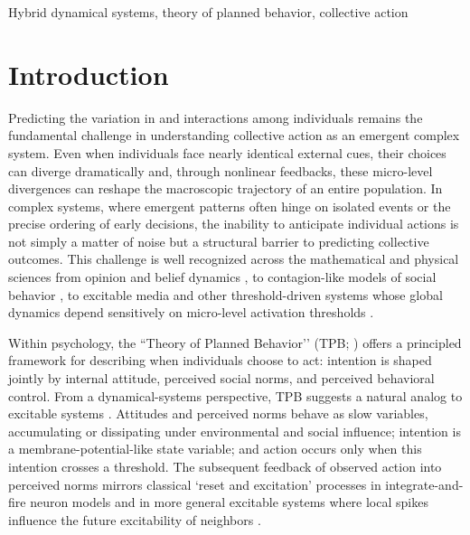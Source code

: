\documentclass[preprint,12pt]{elsarticle}
\begin{document}
\begin{frontmatter}
\begin{keyword}
    Hybrid dynamical systems, theory of planned behavior, collective action
\end{keyword}

\end{frontmatter}



\section{Introduction}\label{sec:introduction}
Predicting the variation in and interactions among individuals remains the fundamental challenge in understanding collective action as an emergent complex system. Even when individuals face nearly identical external cues, their choices can diverge dramatically and, through nonlinear feedbacks, these micro-level divergences can reshape the macroscopic trajectory of an entire population. In complex systems, where emergent patterns often hinge on isolated events or the precise ordering of early decisions, the inability to anticipate individual actions is not simply a matter of noise but a structural barrier to predicting collective outcomes. This challenge is well recognized across the mathematical and physical sciences from opinion and belief dynamics \cite{degroot1974reaching, hegselmann2002opinion, nowak2019nonlinear}, to contagion-like models of social behavior \cite{granovetter1978threshold, watts2002simple, spears2021social}, to excitable media and other threshold-driven systems whose global dynamics depend sensitively on micro-level activation thresholds \cite{acharya2021neuromorphic, marsh2024emergent}.

Within psychology, the ``Theory of Planned Behavior’’ (TPB; \cite{ajzen1991theory, bosnjak2020theory}) offers a principled framework for describing when individuals choose to act: intention is shaped jointly by internal attitude, perceived social norms, and perceived behavioral control. From a dynamical-systems perspective, TPB suggests a natural analog to excitable systems \cite{ciszak2004coupling,gerstner2002spiking}. Attitudes and perceived norms behave as slow variables, accumulating or dissipating under environmental and social influence; intention is a membrane-potential-like state variable; and action occurs only when this intention crosses a threshold. The subsequent feedback of observed action into perceived norms mirrors classical ‘reset and excitation’ processes in integrate-and-fire neuron models \cite{gerstner2002spiking, desroches2022classification} and in more general excitable systems where local spikes influence the future excitability of neighbors \cite{perc2007stochastic, jirsa2004connectivity}.
\end{document}
